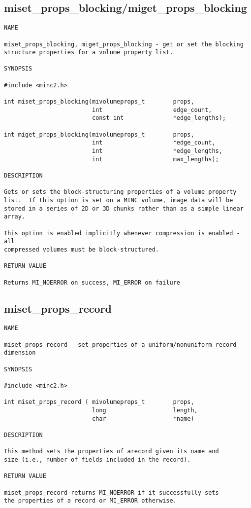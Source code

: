 \documentclass{article}
\begin{document}
\subsection{miset\_props\_blocking/miget\_props\_blocking}
\begin{verbatim}
NAME

miset_props_blocking, miget_props_blocking - get or set the blocking 
structure properties for a volume property list.

SYNOPSIS

#include <minc2.h>

int miset_props_blocking(mivolumeprops_t        props, 
                         int                    edge_count,
                         const int              *edge_lengths);

int miget_props_blocking(mivolumeprops_t        props, 
                         int                    *edge_count, 
                         int                    *edge_lengths, 
                         int                    max_lengths);

DESCRIPTION

Gets or sets the block-structuring properties of a volume property
list.  If this option is set on a MINC volume, image data will be
stored in a series of 2D or 3D chunks rather than as a simple linear
array.

This option is enabled implicitly whenever compression is enabled - all
compressed volumes must be block-structured.

RETURN VALUE

Returns MI_NOERROR on success, MI_ERROR on failure
\end{verbatim}

\subsection{miset\_props\_record}
\begin{verbatim}
NAME

miset_props_record - set properties of a uniform/nonuniform record dimension

SYNOPSIS

#include <minc2.h>

int miset_props_record ( mivolumeprops_t        props,
                         long                   length,
                         char                   *name)

DESCRIPTION

This method sets the properties of arecord given its name and
size (i.e., number of fields included in the record).

RETURN VALUE

miset_props_record returns MI_NOERROR if it successfully sets
the properties of a record or MI_ERROR otherwise.
\end{verbatim}
\end{document}
